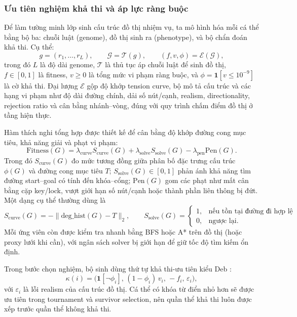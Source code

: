 \documentclass[oneside,a4paper,12pt]{extreport}
\begin{document}
\subsubsection{Ưu tiên nghiệm khả thi và áp lực ràng buộc}
Để làm tường minh lớp sinh cấu trúc đồ thị nhiệm vụ, ta mô hình hóa mỗi cá thể bằng bộ ba: chuỗi luật (genome), đồ thị sinh ra (phenotype), và bộ chẩn đoán khả thi. Cụ thể:
\begin{equation}
g=(r_1,\ldots,r_L),\qquad
\mathcal{G}=\mathcal{T}(g),\qquad
(f,v,\phi)=\mathcal{E}(\mathcal{G}),
\end{equation}
trong đó $L$ là độ dài genome, $\mathcal{T}$ là thủ tục áp chuỗi luật để sinh đồ thị, $f\in[0,1]$ là fitness, $v\ge 0$ là tổng mức vi phạm ràng buộc, và $\phi=\mathbf{1}[v\le 10^{-9}]$ là cờ khả thi. Đại lượng $\mathcal{E}$ gộp độ khớp tension curve, bộ mô tả cấu trúc và các hạng vi phạm như độ dài đường chính, dải số nút/cạnh, realism, directionality, rejection ratio và cân bằng nhánh--vòng, đúng với quy trình chấm điểm đồ thị ở tầng hiện thực.

Hàm thích nghi tổng hợp được thiết kế để cân bằng độ khớp đường cong mục tiêu, khả năng giải và phạt vi phạm:
\begin{equation}
\mathrm{Fitness}(G)=\lambda_{\mathrm{curve}} S_{\mathrm{curve}}(G)+\lambda_{\mathrm{solve}} S_{\mathrm{solve}}(G)-\lambda_{\mathrm{pen}}\mathrm{Pen}(G).
\end{equation}
Trong đó $S_{\mathrm{curve}}(G)$ đo mức tương đồng giữa phân bố đặc trưng cấu trúc $\phi(G)$ và đường cong mục tiêu $T$; $S_{\mathrm{solve}}(G)\in[0,1]$ phản ánh khả năng tìm đường start--goal có tính đến khóa--cổng; $\mathrm{Pen}(G)$ gom các phạt như mất cân bằng cặp key/lock, vượt giới hạn số nút/cạnh hoặc thành phần liên thông bị đứt. Một dạng cụ thể thường dùng là
\begin{equation}
S_{\mathrm{curve}}(G)=-\lVert \mathrm{deg\_hist}(G)-T\rVert_2,
\qquad
S_{\mathrm{solve}}(G)=
\begin{cases}
1, & \text{nếu tồn tại đường đi hợp lệ}\\
0, & \text{ngược lại.}
\end{cases}
\end{equation}
Mỗi ứng viên còn được kiểm tra nhanh bằng BFS hoặc A* trên đồ thị (hoặc proxy lưới khi cần), với ngân sách solver bị giới hạn để giữ tốc độ tìm kiếm ổn định.

Trong bước chọn nghiệm, bộ sinh dùng thứ tự khả thi-ưu tiên kiểu Deb \cite{deb2000constraint}:
\begin{equation}
\kappa(i)=\big(\mathbf{1}[\neg\phi_i],\,(1-\phi_i)\,v_i,\,-f_i,\,\varepsilon_i\big),
\end{equation}
với $\varepsilon_i$ là lỗi realism của cấu trúc đồ thị. Cá thể có khóa từ điển nhỏ hơn sẽ được ưu tiên trong tournament và survivor selection, nên quần thể khả thi luôn được xếp trước quần thể không khả thi.
\end{document}
